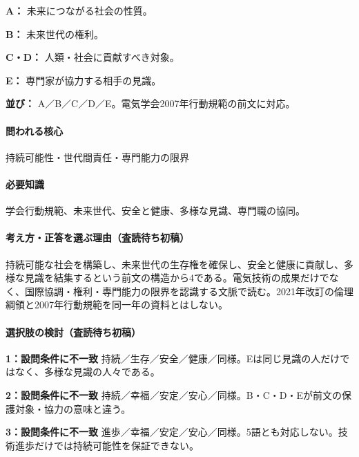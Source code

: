 \noindent\textbf{A：} 未来につながる社会の性質。\par

\noindent\textbf{B：} 未来世代の権利。\par

\noindent\textbf{C・D：} 人類・社会に貢献すべき対象。\par

\noindent\textbf{E：} 専門家が協力する相手の見識。\par

\noindent\textbf{並び：} A／B／C／D／E。電気学会2007年行動規範の前文に対応。\par

\paragraph{問われる核心} 持続可能性・世代間責任・専門能力の限界

\paragraph{必要知識} 学会行動規範、未来世代、安全と健康、多様な見識、専門職の協同。

\paragraph{考え方・正答を選ぶ理由（査読待ち初稿）} 持続可能な社会を構築し、未来世代の生存権を確保し、安全と健康に貢献し、多様な見識を結集するという前文の構造から4である。電気技術の成果だけでなく、国際協調・権利・専門能力の限界を認識する文脈で読む。2021年改訂の倫理綱領と2007年行動規範を同一年の資料とはしない。

\paragraph{選択肢の検討（査読待ち初稿）}\mbox{}\par

\noindent\textbf{1：設問条件に不一致} 持続／生存／安全／健康／同様。Eは同じ見識の人だけではなく、多様な見識の人々である。\par

\noindent\textbf{2：設問条件に不一致} 持続／幸福／安定／安心／同様。B・C・D・Eが前文の保護対象・協力の意味と違う。\par

\noindent\textbf{3：設問条件に不一致} 進歩／幸福／安定／安心／同様。5語とも対応しない。技術進歩だけでは持続可能性を保証できない。\par

